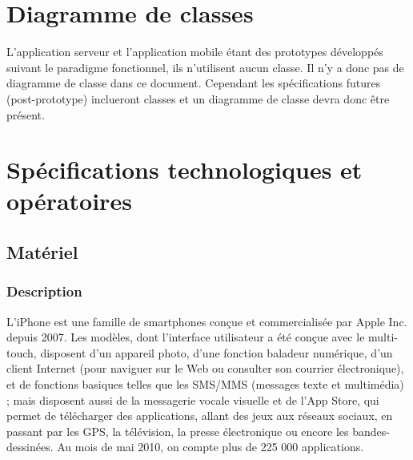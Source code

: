 \documentclass[a4paper,12pt]{report}
\begin{document}
\begin{onehalfspace}
\chapter{Diagramme de classes} %
\label{cha:diagramme_de_classes}

L'application serveur et l'application mobile étant des prototypes développés suivant le paradigme fonctionnel, ils n'utilisent aucun classe. Il n'y a donc pas de diagramme de classe dans ce document. Cependant les spécifications futures (post-prototype) inclueront classes et un diagramme de classe devra donc être présent.

\chapter{Spécifications technologiques et opératoires}


\section{Matériel}
\subsection{Description}
L'iPhone  est une famille de smartphones conçue et commercialisée par Apple Inc. depuis 2007. Les modèles, dont l'interface utilisateur a été conçue avec le multi-touch, disposent d'un appareil photo, d'une fonction baladeur numérique, d'un client Internet (pour naviguer sur le Web ou consulter son courrier électronique), et de fonctions basiques telles que les SMS/MMS (messages texte et multimédia) ; mais disposent aussi de la messagerie vocale visuelle et de l'App Store, qui permet de télécharger des applications, allant des jeux aux réseaux sociaux, en passant par les GPS, la télévision, la presse électronique ou encore les bandes-dessinées. Au mois de mai 2010, on compte plus de 225 000 applications.


\end{onehalfspace}
\end{document}
